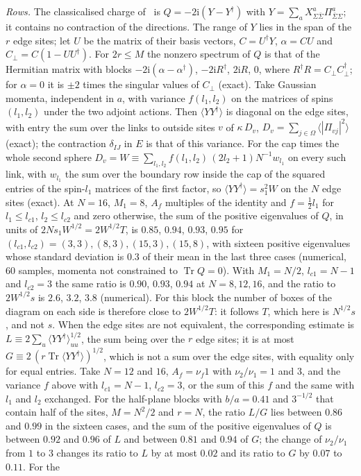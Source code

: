 \emph{Rows.} The classicalised charge of~\cite{FlissFrenkelHartnollSoni2025} is \(Q=-2\mathrm i(Y-Y^\dagger)\) with \(Y=\sum_aX^a_{\Sigma\bar\Sigma}\Pi^a_{\bar\Sigma\Sigma}\); it contains no contraction of the directions. The range of \(Y\) lies in the span of the \(r\) edge sites; let \(U\) be the matrix of their basis vectors, \(C=U^\dagger Y\), \(\alpha=CU\) and \(C_\perp=C(1-UU^\dagger)\). For \(2r\le M\) the nonzero spectrum of \(Q\) is that of the Hermitian matrix with blocks \(-2\mathrm i(\alpha-\alpha^\dagger)\), \(-2\mathrm iR^\dagger\), \(2\mathrm iR\), \(0\), where \(R^\dagger R=C_\perp C_\perp^\dagger\); for \(\alpha=0\) it is \(\pm2\) times the singular values of \(C_\perp\) (exact). Take Gaussian momenta, independent in \(a\), with variance \(f(l_1,l_2)\) on the matrices of spins \((l_1,l_2)\) under the two adjoint actions. Then \(\langle YY^\dagger\rangle\) is diagonal on the edge sites, with entry the sum over the links to outside sites \(v\) of \(\kappa\,D_v\), \(D_v=\sum_{j\in\Omega}\langle|\Pi_{vj}|^2\rangle\) (exact); the contraction \(\delta_{IJ}\) in \(E\) is that of this variance. For the cap times the whole second sphere \(D_v=W\equiv\sum_{l_1,l_2}f(l_1,l_2)\,(2l_2+1)N^{-1}w_{l_1}\) on every such link, with \(w_{l_1}\) the sum over the boundary row inside the cap of the squared entries of the spin-\(l_1\) matrices of the first factor, so \(\langle YY^\dagger\rangle=s_1^2W\) on the \(N\) edge sites (exact). At \(N=16\), \(M_1=8\), \(A_f\) multiples of the identity and \(f=\tfrac12l_1\) for \(l_1\le l_{c1}\), \(l_2\le l_{c2}\) and zero otherwise, the sum of the positive eigenvalues of \(Q\), in units of \(2Ns_1W^{1/2}=2W^{1/2}T\), is \(0.85\), \(0.94\), \(0.93\), \(0.95\) for \((l_{c1},l_{c2})=(3,3),(8,3),(15,3),(15,8)\), with sixteen positive eigenvalues whose standard deviation is \(0.3\) of their mean in the last three cases (numerical, \(60\) samples, momenta not constrained to \(\operatorname{Tr}Q=0\)). With \(M_1=N/2\), \(l_{c1}=N-1\) and \(l_{c2}=3\) the same ratio is \(0.90\), \(0.93\), \(0.94\) at \(N=8,12,16\), and the ratio to \(2W^{1/2}s\) is \(2.6\), \(3.2\), \(3.8\) (numerical). For this block the number of boxes of the diagram on each side is therefore close to \(2W^{1/2}T\): it follows \(T\), which here is \(N^{1/2}s\), and not \(s\). When the edge sites are not equivalent, the corresponding estimate is \(L\equiv2\sum_u\langle YY^\dagger\rangle_{uu}^{1/2}\), the sum being over the \(r\) edge sites; it is at most \(G\equiv2\,(r\operatorname{Tr}\langle YY^\dagger\rangle)^{1/2}\), which is not a sum over the edge sites, with equality only for equal entries. Take \(N=12\) and \(16\), \(A_f=\nu_f1\) with \(\nu_2/\nu_1=1\) and \(3\), and the variance \(f\) above with \(l_{c1}=N-1\), \(l_{c2}=3\), or the sum of this \(f\) and the same with \(l_1\) and \(l_2\) exchanged. For the half-plane blocks with \(b/a=0.41\) and \(3^{-1/2}\) that contain half of the sites, \(M=N^2/2\) and \(r=N\), the ratio \(L/G\) lies between \(0.86\) and \(0.99\) in the sixteen cases, and the sum of the positive eigenvalues of \(Q\) is between \(0.92\) and \(0.96\) of \(L\) and between \(0.81\) and \(0.94\) of \(G\); the change of \(\nu_2/\nu_1\) from \(1\) to \(3\) changes its ratio to \(L\) by at most \(0.02\) and its ratio to \(G\) by \(0.07\) to \(0.11\). For the 